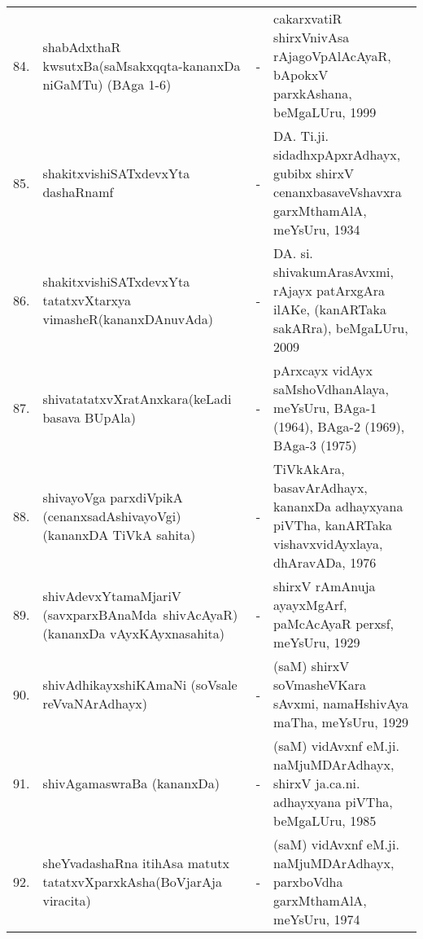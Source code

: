 {\begin{longtable}{rp{6cm}cp{9cm}<{\raggedright}@{}}
84. & shabAdxthaR kwsutxBa\newline (saMsakxqqta-kananxDa niGaMTu) (BAga 1-6) &-& cakarxvatiR shirxVnivAsa rAjagoVpAlAcAyaR, bApokxV parxkAshana, beMgaLUru, 1999\\
85. & shakitxvishiSATxdevxYta dashaRnamf &-& DA. Ti.ji. sidadhxpApxrAdhayx, gubibx shirxV cenanxbasaveVshavxra garxMthamAlA, meYsUru, 1934\\
86. & shakitxvishiSATxdevxYta tatatxvXtarxya vimasheR\newline (kananxDAnuvAda) &-& DA. si. shivakumArasAvxmi, rAjayx patArxgAra ilAKe, (kanARTaka sakARra), beMgaLUru, 2009\\
87. & shivatatatxvXratAnxkara\newline (keLadi basava BUpAla) &-& pArxcayx vidAyx saMshoVdhanAlaya, meYsUru, BAga-1 (1964), BAga-2 (1969), BAga-3 (1975)\\
88. & shivayoVga parxdiVpikA (\hbox{cenanxsadAshiva\-yoVgi})\newline (kananxDA TiVkA sahita) &-& TiVkAkAra, basavArAdhayx, kananxDa adhayxyana piVTha, kanARTaka vishavxvidAyxlaya, dhAravADa, 1976\\
89. & shivAdevxYtamaMjariV \hbox{(savxparxBAnaMda shivAcAyaR)}\newline (kananxDa vAyxKAyxnasahita) &-& shirxV rAmAnuja ayayxMgArf, paMcAcAyaR perxsf, meYsUru, 1929\\
90. & shivAdhikayxshiKAmaNi (soVsale \hbox{reVvaNArAdhayx}) &-& (saM) shirxV soVmasheVKara sAvxmi, namaHshivAya maTha, meYsUru, 1929\\
91. & shivAgamaswraBa (kananxDa) &-& (saM) vidAvxnf eM.ji. naMjuMDArAdhayx, shirxV ja.ca.ni. adhayxyana piVTha, beMgaLUru, 1985\\
92. & sheYvadashaRna itihAsa matutx tatatxvXparxkAsha\newline (BoVjarAja viracita) &-& (saM) vidAvxnf eM.ji. naMjuMDArAdhayx, parxboVdha garxMthamAlA, meYsUru, 1974\\

\end{longtable}}
